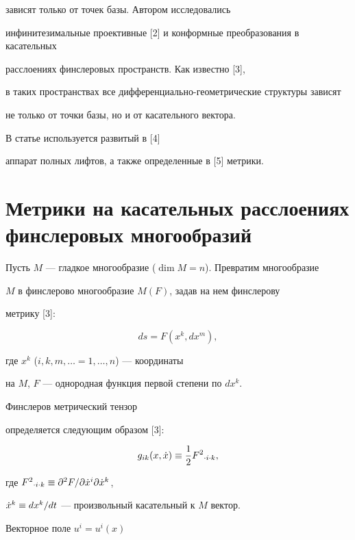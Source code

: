 зависят только от точек базы. Автором исследовались


инфинитезимальные проективные [2] и конформные преобразования в касательных


расслоениях финслеровых пространств. Как известно [3],


в таких пространствах все дифференциально-геометрические структуры зависят


не только от точки базы, но и от касательного вектора.


В статье используется развитый в [4]


аппарат полных лифтов, а также определенные в [5] метрики.





\section{Метрики на касательных расслоениях\protect\\


финслеровых многообразий}





Пусть $M$ --- гладкое многообразие ($\dim M= n$). Превратим многообразие


$M$ в финслерово многообразие $M(F)$, задав на нем финслерову


метрику [3]:


$$


ds = F(x^{k},dx^{m}),


$$


где $x^{k}$ ($i,k,m,\dotsc= 1,\dotsc,n$) --- координаты 


на $M$, $F$ --- однородная функция первой степени по $dx^{k}$.


Финслеров метрический тензор


определяется следующим образом [3]:


$$


g_{ik}(x,\xt) \equiv \frac{1}{2}F^{2}{}_{\cdot i\cdot k},


$$


где $F^{2}{}_{\cdot i\cdot k}\equiv \partial^2F/\partial


\xt^i\partial \xt^k$,


$\Dot x^k\equiv dx^{k}/dt$ --- произвольный касательный к $M$ вектор.





Векторное поле $u^{i} = u^{i}(x)$


